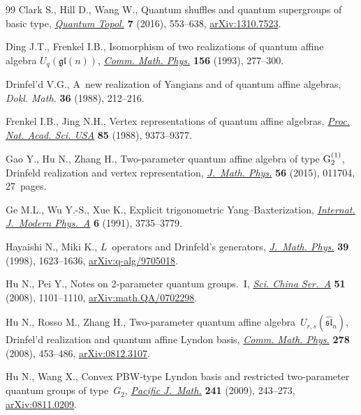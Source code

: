 \begin{thebibliography}{99}
Clark S., Hill D., Wang W., Quantum shuffles and quantum supergroups of basic
 type, \href{https://doi.org/10.4171/QT/81}{\textit{Quantum Topol.}}
 \textbf{7} (2016), 553--638,
 \href{http://arxiv.org/abs/1310.7523}{arXiv:1310.7523}.

Ding J.T., Frenkel I.B., Isomorphism of two realizations of quantum affine
 algebra {$U_q(\mathfrak{gl}(n))$},
 \href{https://doi.org/10.1007/BF02098484}{\textit{Comm. Math. Phys.}}
 \textbf{156} (1993), 277--300.

Drinfel'd V.G., A~new realization of {Y}angians and of quantum affine algebras,
 \textit{Dokl. Math.} \textbf{36} (1988), 212--216.

Frenkel I.B., Jing N.H., Vertex representations of quantum affine algebras,
 \href{https://doi.org/10.1073/pnas.85.24.9373}{\textit{Proc. Nat. Acad. Sci.
 USA}} \textbf{85} (1988), 9373--9377.

Gao Y., Hu N., Zhang H., Two-parameter quantum affine algebra of type {${\rm
 G}_2^{(1)}$}, {D}rinfeld realization and vertex representation,
 \href{https://doi.org/10.1063/1.4905724}{\textit{J.~Math. Phys.}} \textbf{56}
 (2015), 011704, 27~pages.

Ge M.L., Wu Y.-S., Xue K., Explicit trigonometric {Y}ang--{B}axterization,
 \href{https://doi.org/10.1142/S0217751X91001817}{\textit{Internat. J.~Modern
 Phys.~A}} \textbf{6} (1991), 3735--3779.

Hayaishi N., Miki K., {$L$}~operators and {D}rinfeld's generators,
 \href{https://doi.org/10.1063/1.532398}{\textit{J.~Math. Phys.}} \textbf{39}
 (1998), 1623--1636,
 \href{http://arxiv.org/abs/q-alg/9705018}{arXiv:q-alg/9705018}.

Hu N., Pei Y., Notes on 2-parameter quantum groups.~{I},
 \href{https://doi.org/10.1007/s11425-008-0026-y}{\textit{Sci. China Ser.~A}}
 \textbf{51} (2008), 1101--1110,
 \href{http://arxiv.org/abs/math.QA/0702298}{arXiv:math.QA/0702298}.

Hu N., Rosso M., Zhang H., Two-parameter quantum affine
 algebra~{$U_{r,s}(\widehat{\mathfrak{sl}}_n)$}, {D}rinfel'd realization and
 quantum affine {L}yndon basis,
 \href{https://doi.org/10.1007/s00220-007-0405-1}{\textit{Comm. Math. Phys.}}
 \textbf{278} (2008), 453--486,
 \href{http://arxiv.org/abs/0812.3107}{arXiv:0812.3107}.

Hu N., Wang X., Convex {PBW}-type {L}yndon basis and restricted two-parameter
 quantum groups of type~{$G_2$},
 \href{https://doi.org/10.2140/pjm.2009.241.243}{\textit{Pacific J.~Math.}}
 \textbf{241} (2009), 243--273,
 \href{http://arxiv.org/abs/0811.0209}{arXiv:0811.0209}.


\end{thebibliography}
